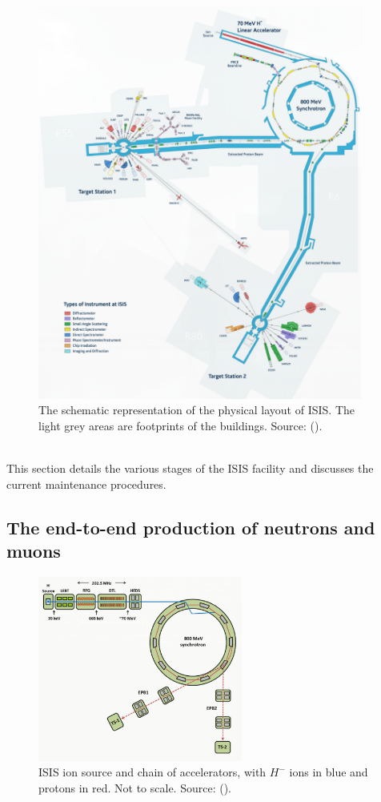 \documentclass[10pt,oneside]{report}
\begin{document}
\begin{figure}[htbp]
    \centering
    \includegraphics[width=0.95\textwidth]{ISIS.png}
    \caption{The schematic representation of the physical layout of ISIS. The light grey areas are footprints of the buildings. Source: (\citet{thomason2019isis}).}\label{fig:isis}
\end{figure}

\textbf{}\\This section details the various stages of the ISIS facility and discusses the current maintenance procedures.

\subsection{The end-to-end production of neutrons and muons}
\begin{figure}[htbp]
    \centering
    \includegraphics[width=0.6\textwidth]{ISIS2.png}
    \caption{ISIS ion source and chain of accelerators, with $H^-$ ions in blue and protons in red. Not to scale. Source: (\citet{2021practicalguide}).}\label{fig:isis2}
\end{figure}
\end{document}
